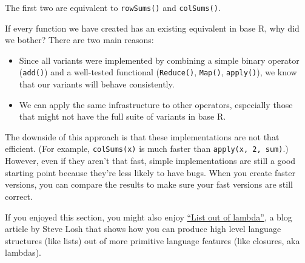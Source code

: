 \begin{Shaded}
\begin{Highlighting}[]
\StringTok{ } \NormalTok{) \{}
   
\NormalTok{\}}
\StringTok{ } \NormalTok{) \{}
   
\NormalTok{\}}
\StringTok{ } \NormalTok{) \{}
   
\NormalTok{\}}
\end{Highlighting}
\end{Shaded}

The first two are equivalent to \texttt{rowSums()} and
\texttt{colSums()}.

If every function we have created has an existing equivalent in base R,
why did we bother? There are two main reasons:

\begin{itemize}
\item
  Since all variants were implemented by combining a simple binary
  operator (\texttt{add()}) and a well-tested functional
  (\texttt{Reduce()}, \texttt{Map()}, \texttt{apply()}), we know that
  our variants will behave consistently.
\item
  We can apply the same infrastructure to other operators, especially
  those that might not have the full suite of variants in base R.
\end{itemize}

The downside of this approach is that these implementations are not that
efficient. (For example, \texttt{colSums(x)} is much faster than
\texttt{apply(x, 2, sum)}.) However, even if they aren't that fast,
simple implementations are still a good starting point because they're
less likely to have bugs. When you create faster versions, you can
compare the results to make sure your fast versions are still correct.

If you enjoyed this section, you might also enjoy
\href{http://stevelosh.com/blog/2013/03/list-out-of-lambda/}{``List out
of lambda''}, a blog article by Steve Losh that shows how you can
produce high level language structures (like lists) out of more
primitive language features (like closures, aka lambdas).


